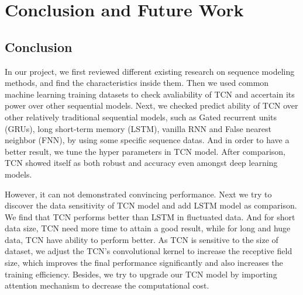 
\chapter{Conclusion and Future Work} %

\label{Chapter5} %


\section{Conclusion}
In our project, we first reviewed different existing research on sequence modeling methods, and find the characteristics inside them. Then we used common machine learning training datasets to check avaliability of TCN and accertain its power over other sequential models. Next, we checked predict ability of TCN over other relatively traditional sequential models, such as Gated recurrent units (GRUs), long short-term memory (LSTM), vanilla RNN and False nearest neighbor (FNN),  by using some specific sequence datas. And in order to have a better result, we tune the hyper parameters in TCN model. After comparison, TCN showed itself as both robust and accuracy even amongst deep learning models. 

However, it can not demonstrated convincing performance. Next we try to discover the data sensitivity of TCN model and add LSTM model as comparison. We find that TCN performs better than LSTM in fluctuated data. And for short data size, TCN need more time to attain a good result, while for long and huge data, TCN have ability to perform better. As TCN is sensitive to the size of dataset, we adjust the TCN's convolutional kernel to increase the receptive field size, which improves the final performance significantly and also increases the training efficiency. Besides, we try to upgrade our TCN model by importing attention mechanism to decrease the computational cost.

